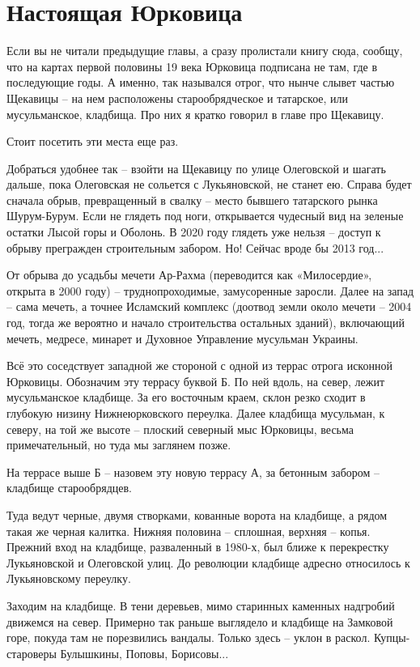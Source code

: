 \chapter{Настоящая Юрковица}

Если вы не читали предыдущие главы, а сразу пролистали книгу сюда, сообщу, что на картах первой половины 19 века Юрковица подписана не там, где в последующие годы. А именно, так назывался отрог, что нынче слывет частью Щекавицы – на нем расположены старообрядческое и татарское, или мусульманское, кладбища. Про них я кратко говорил в главе про Щекавицу.

Стоит посетить эти места еще раз.

Добраться удобнее так – взойти на Щекавицу по улице Олеговской и шагать дальше, пока Олеговская не сольется с Лукьяновской, не станет ею. Справа будет сначала обрыв, превращенный в свалку – место бывшего татарского рынка Шурум-Бурум. Если не глядеть под ноги, открывается чудесный вид на зеленые остатки Лысой горы и Оболонь. В 2020 году глядеть уже нельзя – доступ к обрыву прегражден строительным забором. Но! Сейчас вроде бы 2013 год...

От обрыва до усадьбы мечети Ар-Рахма (переводится как «Милосердие», открыта в 2000 году) – труднопроходимые, замусоренные заросли. Далее на запад – сама мечеть, а точнее Исламский комплекс (доотвод земли около мечети – 2004 год, тогда же вероятно и начало строительства остальных зданий), включающий мечеть, медресе, минарет и Духовное Управление мусульман Украины.

Всё это соседствует западной же стороной с одной из террас отрога исконной Юрковицы. Обозначим эту террасу буквой Б. По ней вдоль, на север, лежит мусульманское кладбище. За его восточным краем, склон резко сходит в глубокую низину Нижнеюрковского переулка. Далее кладбища мусульман, к северу, на той же высоте – плоский северный мыс Юрковицы, весьма примечательный, но туда мы заглянем позже.

На террасе выше Б – назовем эту новую террасу А, за бетонным забором – кладбище старообрядцев.

Туда ведут черные, двумя створками, кованные ворота на кладбище, а рядом такая же черная калитка. Нижняя половина – сплошная, верхняя – копья. Прежний вход на кладбище, разваленный в 1980-х, был ближе к перекрестку Лукьяновской и Олеговской улиц. До революции кладбище адресно относилось к Лукьяновскому переулку.

Заходим на кладбище. В тени деревьев, мимо старинных каменных надгробий движемся на север. Примерно так раньше выглядело и кладбище на Замковой горе, покуда там не порезвились вандалы. Только здесь – уклон в раскол. Купцы-староверы Булышкины, Поповы, Борисовы...

